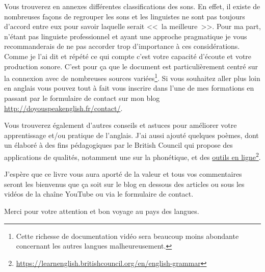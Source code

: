 Vous trouverez en annexes différentes classifications des sons. En
effet, il existe de nombreuses façons de regrouper les sons et les
linguistes ne sont pas toujours d'accord entre eux pour savoir
laquelle serait <<~la meilleure~>>. Pour ma part, n'étant pas
linguiste professionnel et ayant une approche pragmatique je vous
recommanderais de ne pas accorder trop d'importance à ces
considérations. Comme je l'ai dit et répété ce qui compte c'est votre
capacité d'écoute et votre production sonore. C'est pour ça que le
document est particulièrement centré sur la connexion avec de
nombreuses sources variées\footnote{Cette richesse de documentation
  vidéo sera beaucoup moins abondante concernant les autres
  langues malheureusement.}.
Si vous souhaitez aller plus loin en anglais vous pouvez tout à fait
vous inscrire dans l'une de mes formations en passant par le
formulaire de contact sur mon blog
\url{http://doyouspeakenglish.fr/contact/}.

Vous trouverez également d'autres conseils et astuces pour améliorer
votre apprentissage et/ou pratique de l'anglais. J'ai aussi ajouté
quelques poèmes, dont un élaboré à des fins pédagogiques par le
British Council qui propose des applications de qualités, notamment
une sur la phonétique, et des
\href{https://learnenglish.britishcouncil.org/en/english-grammar}{outils
  en
  ligne}\footnote{\url{https://learnenglish.britishcouncil.org/en/english-grammar}}.

J'espère que ce livre vous aura aporté de la valeur et tous vos
commentaires seront les bienvenus que ça soit sur le blog en dessous
des articles ou sous les vidéos de la chaîne YouTube ou via le
formulaire de contact.

Merci pour votre attention et bon voyage au pays des langues.
